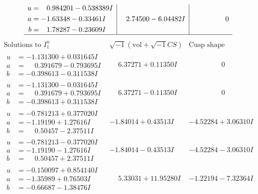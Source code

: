 \documentclass[1p]{elsarticle_modified}
\theoremstyle{definition}
\newcommand{\I}{\sqrt{-1}}
\begin{document}
$$\begin{array}{c|c|c}
\begin{aligned}
u &= \phantom{-}0.984201 - 0.538389 I \\
a &= -1.63348 - 0.33461 I \\
b &= \phantom{-}1.78287 - 0.23609 I\end{aligned}
 & \phantom{-}2.74500 - 6.04482 I & \phantom{-0.000000 } 0\\
 \hline 
 \end{array}$$\newpage$$\begin{array}{c|c|c}  
\text{Solutions to }I^u_{1}& \I (\text{vol} + \sqrt{-1}CS) & \text{Cusp shape}\\
 \hline 
\begin{aligned}
u &= -1.131300 + 0.031645 I \\
a &= \phantom{-}0.391679 - 0.793695 I \\
b &= -0.398613 - 0.311538 I\end{aligned}
 & \phantom{-}6.37271 + 0.11350 I & \phantom{-0.000000 } 0 \\ \hline\begin{aligned}
u &= -1.131300 - 0.031645 I \\
a &= \phantom{-}0.391679 + 0.793695 I \\
b &= -0.398613 + 0.311538 I\end{aligned}
 & \phantom{-}6.37271 - 0.11350 I & \phantom{-0.000000 } 0 \\ \hline\begin{aligned}
u &= -0.781213 + 0.377020 I \\
a &= -1.19190 + 1.27616 I \\
b &= \phantom{-}0.50457 - 2.37511 I\end{aligned}
 & -1.84014 + 0.43513 I & -4.52284 + 3.06310 I \\ \hline\begin{aligned}
u &= -0.781213 - 0.377020 I \\
a &= -1.19190 - 1.27616 I \\
b &= \phantom{-}0.50457 + 2.37511 I\end{aligned}
 & -1.84014 - 0.43513 I & -4.52284 - 3.06310 I \\ \hline\begin{aligned}
u &= -0.150097 + 0.854140 I \\
a &= -1.35989 + 0.76503 I \\
b &= -0.66687 - 1.38476 I\end{aligned}
 & \phantom{-}5.33031 + 11.95280 I & -1.22194 - 7.32364 I \\ \hline\begin{aligned}

\end{aligned}
\end{array}$$
\end{document}
